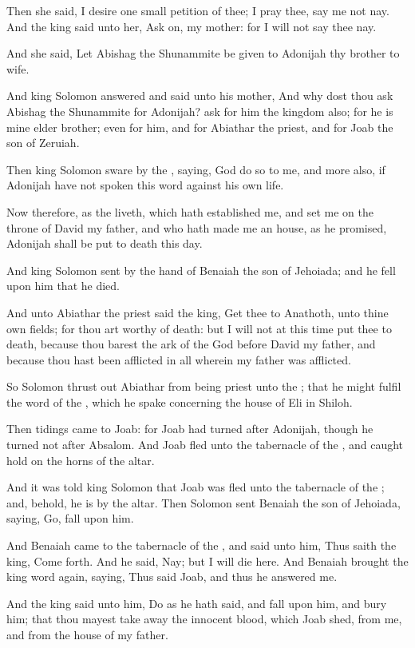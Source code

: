 \verse Then she said, I desire one small petition of thee; I pray thee, say me not nay. And the king said unto her, Ask on, my mother: for I will not say thee nay.

\verse And she said, Let Abishag the Shunammite be given to Adonijah thy brother to wife.

\verse And king Solomon answered and said unto his mother, And why dost thou ask Abishag the Shunammite for Adonijah? ask for him the kingdom also; for he is mine elder brother; even for him, and for Abiathar the priest, and for Joab the son of Zeruiah.

\verse Then king Solomon sware by the \LORD, saying, God do so to me, and more also, if Adonijah have not spoken this word against his own life.

\verse Now therefore, as the \LORD liveth, which hath established me, and set me on the throne of David my father, and who hath made me an house, as he promised, Adonijah shall be put to death this day.

\verse And king Solomon sent by the hand of Benaiah the son of Jehoiada; and he fell upon him that he died.

\verse And unto Abiathar the priest said the king, Get thee to Anathoth, unto thine own fields; for thou art worthy of death: but I will not at this time put thee to death, because thou barest the ark of the \LORD God before David my father, and because thou hast been afflicted in all wherein my father was afflicted.

\verse So Solomon thrust out Abiathar from being priest unto the \LORD; that he might fulfil the word of the \LORD, which he spake concerning the house of Eli in Shiloh.

\verse Then tidings came to Joab: for Joab had turned after Adonijah, though he turned not after Absalom. And Joab fled unto the tabernacle of the \LORD, and caught hold on the horns of the altar.

\verse And it was told king Solomon that Joab was fled unto the tabernacle of the \LORD; and, behold, he is by the altar. Then Solomon sent Benaiah the son of Jehoiada, saying, Go, fall upon him.

\verse And Benaiah came to the tabernacle of the \LORD, and said unto him, Thus saith the king, Come forth. And he said, Nay; but I will die here. And Benaiah brought the king word again, saying, Thus said Joab, and thus he answered me.

\verse And the king said unto him, Do as he hath said, and fall upon him, and bury him; that thou mayest take away the innocent blood, which Joab shed, from me, and from the house of my father.

